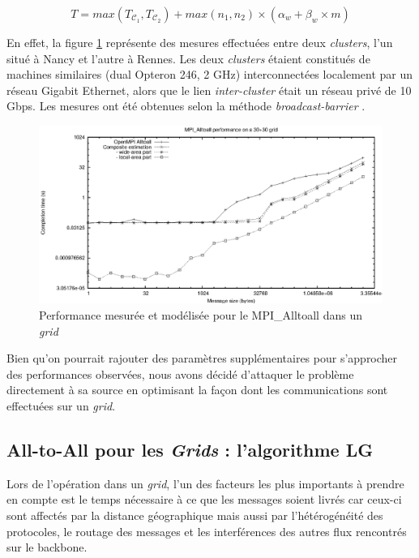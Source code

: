 \begin{equation}
T=max(T_{\mathcal C_1},T_{\mathcal C_2})+max(n_1, n_2) \times (\alpha_w+\beta_w \times m)
\label{eq:7}\end{equation}

En effet, la figure \ref{Figure: standard} représente des mesures effectuées entre deux \textit{clusters}, l'un situé à Nancy et l'autre à Rennes. Les deux \textit{clusters} étaient constitués de machines similaires (dual Opteron 246, 2 GHz) interconnectées localement par un réseau Gigabit Ethernet, alors que le lien \textit{inter-cluster} était un réseau privé de 10 Gbps. Les mesures ont été obtenues selon la méthode \emph{broadcast-barrier} \cite{Supinski99}.


\begin{figure}
	\centering
	\includegraphics[width=0.7\columnwidth]{images/standard}
	\caption{\label{Figure: standard}Performance mesurée et modélisée pour le MPI\_Alltoall dans un \textit{grid}} %
\end{figure}
 
Bien qu'on pourrait rajouter des paramètres supplémentaires pour s'approcher des performances observées, nous avons décidé d'attaquer le problème directement à sa source en optimisant la façon dont les communications sont effectuées sur un \textit{grid}. 


\subsection{All-to-All pour les \textit{Grids} : l'algorithme LG}

Lors de l'opération dans un \textit{grid}, l'un des facteurs les plus importants à prendre en compte est le temps nécessaire à ce que les messages soient livrés car ceux-ci sont affectés par la distance géographique mais aussi par l'hétérogénéité des protocoles, le routage des messages et les interférences des autres flux rencontrés sur le backbone. 

